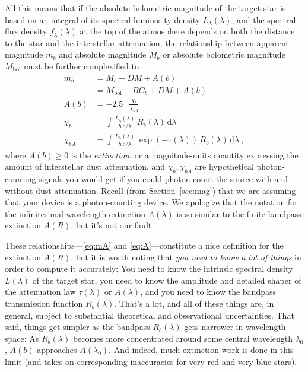 \documentclass[10pt]{article}
\newcommand{\sectionname}{Section}
\newcommand{\secref}[1]{\sectionname~\ref{#1}}
\newcommand{\dd}{\mathrm{d}}
\newcommand{\bol}{\text{bol}}
\DeclareMathOperator{\logten}{log_{10}}
\begin{document}
All this means that if the absolute bolometric magnitude of the target star is based on an integral of its spectral luminosity density $L_\lambda(\lambda)$, and the spectral flux density $f_\lambda(\lambda)$ at the top of the atmosphere depends on both the distance to the star and the interstellar attenuation, the relationship between apparent magnitude $m_b$ and absolute magnitude $M_b$ or absolute bolometric magnitude $M_\bol$ must be further complexified to
\begin{align}
    m_b &= M_b + DM + A(b)\label{eq:mA}\\
        &= M_\bol - BC_b + DM + A(b)\\
    A(b) &= -2.5\,\logten\frac{\chi_b}{\chi_{bA}}\label{eq:A}\\
    \chi_b &= \int \frac{L_\lambda(\lambda)}{h\,c/\lambda}\,R_b(\lambda)\,\dd\lambda\\
    \chi_{bA} &= \int \frac{L_\lambda(\lambda)}{h\,c/\lambda}\,\exp(-\tau(\lambda))\,R_b(\lambda)\,\dd\lambda ~,
    \end{align}
where $A(b)\geq 0$ is the \emph{extinction}, or a magnitude-units quantity expressing the amount of interstellar dust attenuation,
and $\chi_b,\chi_{bA}$ are hypothetical photon-counting signals you would get if you could photon-count the source with and without dust attenuation.
Recall (from \secref{sec:mag}) that we are assuming that your device is a photon-counting device.
We apologize that the notation for the infinitesimal-wavelength extinction $A(\lambda)$ is so similar to the finite-bandpass extinction $A(R)$, but it's not our fault.

These relationships---\eqref{eq:mA} and \eqref{eq:A}---constitute a nice definition for the extinction $A(R)$, but it is worth noting that \emph{you need to know a lot of things} in order to compute it accurately:
You need to know the intrinsic spectral density $L(\lambda)$ of the target star, you need to know the amplitude and detailed shaper of the attenuation law $\tau(\lambda)$ or $A(\lambda)$, and you need to know the bandpass transmission function $R_b(\lambda)$.
That's a lot, and all of these things are, in general, subject to substantial theoretical and observational uncertainties.
That said, things get simpler as the bandpass $R_b(\lambda)$ gets narrower in wavelength space:
As $R_b(\lambda)$ becomes more concentrated around some central wavelength $\lambda_0$, $A(b)$ approaches $A(\lambda_0)$.
And indeed, much extinction work is done in this limit (and takes on corresponding inaccuracies for very red and very blue stars).
\end{document}
